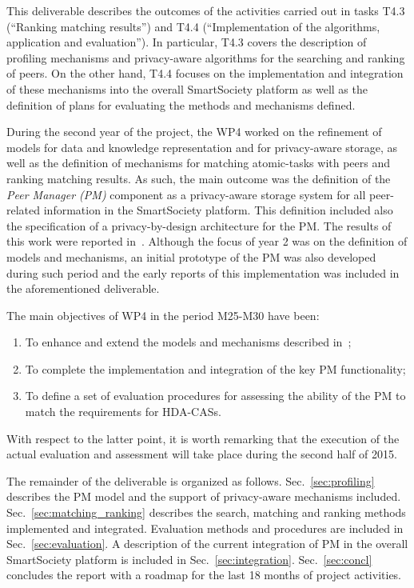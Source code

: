 This deliverable describes the outcomes of the activities carried out in tasks T4.3 (``Ranking matching results'') and T4.4 (``Implementation of the algorithms, application and evaluation''). In particular, T4.3 covers the description of profiling mechanisms and privacy-aware algorithms  %
for the searching and ranking of peers. On the other hand, T4.4 focuses on the implementation and integration of these mechanisms into the overall SmartSociety platform as well as the definition of plans for evaluating the methods and mechanisms defined.

During the second year of the project, the WP4 worked on the refinement of models for data and knowledge representation and for privacy-aware storage, as well as the definition of mechanisms for matching atomic-tasks with peers and ranking matching results. 
As such, the main outcome was the definition of the \emph{Peer Manager (PM)} component as a privacy-aware storage system for all peer-related information in the SmartSociety platform. This definition included also the specification of a privacy-by-design architecture for the PM. The results of this work were reported in~\cite{D4.2}.
Although the focus of year 2 was on the definition of models and mechanisms, an initial prototype of the PM was also developed during such period and the early reports of this implementation was included in the aforementioned deliverable. 

The main objectives of WP4 in the period M25-M30 have been:
\begin{enumerate}
\item To enhance and extend the models and mechanisms described in~\cite{D4.2};
\item To complete the implementation and integration of the key PM functionality;
\item To define a set of evaluation procedures for assessing the ability of the PM to match the requirements for HDA-CASs. 
\end{enumerate}

With respect to the latter point, it is worth remarking that the execution of the actual evaluation and assessment will take place during the second half of 2015. 

The remainder of the deliverable is organized as follows. Sec.~\ref{sec:profiling} describes the PM model and the support of privacy-aware mechanisms included. Sec.~\ref{sec:matching_ranking} describes the search, matching and ranking methods implemented and integrated. Evaluation methods and procedures are included in Sec.~\ref{sec:evaluation}. A description of the current integration of PM in the overall SmartSociety platform is included in Sec.~\ref{sec:integration}. Sec.~\ref{sec:concl} concludes the report with a roadmap for the last 18 months of project activities.